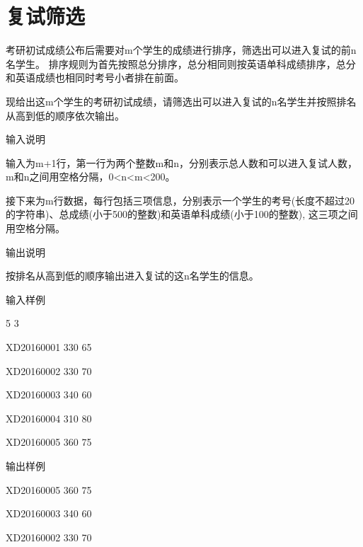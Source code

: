 %
%
%

\section{复试筛选}	
考研初试成绩公布后需要对m个学生的成绩进行排序，筛选出可以进入复试的前n名学生。
排序规则为首先按照总分排序，总分相同则按英语单科成绩排序，总分和英语成绩也相同时考号小者排在前面。

现给出这m个学生的考研初试成绩，请筛选出可以进入复试的n名学生并按照排名从高到低的顺序依次输出。

输入说明	

输入为m+1行，第一行为两个整数m和n，分别表示总人数和可以进入复试人数，m和n之间用空格分隔，0<n<m<200。

接下来为m行数据，每行包括三项信息，分别表示一个学生的考号(长度不超过20的字符串)、总成绩(小于500的整数)和英语单科成绩(小于100的整数), 这三项之间用空格分隔。

输出说明

按排名从高到低的顺序输出进入复试的这n名学生的信息。

输入样例	

5 3

XD20160001 330 65

XD20160002 330 70

XD20160003 340 60

XD20160004 310 80

XD20160005 360 75

输出样例	

XD20160005 360 75

XD20160003 340 60

XD20160002 330 70

